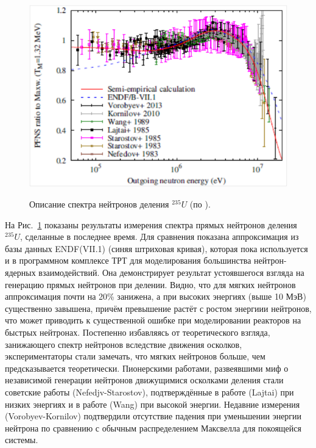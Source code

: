 \documentclass[a4paper,12pt]{article}
\begin{document}
\begin{large}
    \begin{figure}[ht]
    {
       \includegraphics[width=0.90\linewidth]{images/SpecU235}
    }
    \caption{Описание спектра нейтронов деления $^{235}U$ (по \cite{Capote16}).}
    \label{fig:SpecU235}
  \end{figure}
  На Рис.~\ref{fig:SpecU235} показаны результаты измерения спектра прямых нейтронов деления $^{235}U$, сделанные в последнее время.
  Для сравнения показана аппроксимация из базы данных ENDF(VII.1) \cite{ENDF/B-VII.1} (синяя штриховая кривая), которая пока используется и в программном комплексе ТРТ для моделирования большинства нейтрон-ядерных взаимодействий.
  Она демонстрирует результат устоявшегося взгляда на генерацию прямых нейтронов при делении.
  Видно, что для мягких нейтронов аппроксимация почти на 20\% занижена, а при высоких энергиях (выше 10 МэВ) существенно завышена, причём превышение растёт с ростом энергиии нейтронов, что может приводить к существенной ошибке при моделировании реакторов на быстрых нейтронах.
  Постепенно избавляясь от теоретического взгляда, занижающего спектр нейтронов вследствие движения осколков, экспериментаторы стали замечать, что мягких нейтронов больше, чем предсказывается теоретически.
  Пионерскими работами, развеявшими миф о независимой генерации нейтронов движущимися осколками деления стали советские работы \cite{Nefed83,Starost83,Starostov85} (Nefedjv-Starostov), подтверждённые в работе \cite{Lajtai85} (Lajtai) при низких энергиях и в работе \cite{Wand89} (Wang) при высокой энергии.
  Недавние измерения \cite{Kornilov10,Vorobyev13} (Vorobyev-Kornilov) подтвердили отсутствие падения при уменьшении энергии нейтрона по сравнению с обычным распределением Максвелла для покоящейся системы.
      

\end{large}
\end{document}
